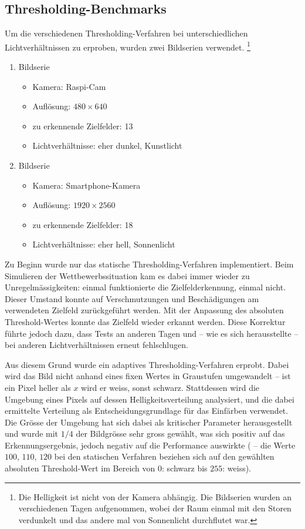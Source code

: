 \subsection{Thresholding-Benchmarks}
\label{app:thresholding}

Um die verschiedenen Thresholding-Verfahren bei unterschiedlichen Lichtverhältnissen zu erproben, wurden zwei Bildserien verwendet. \footnote{Die Helligkeit ist nicht von der Kamera abhängig. Die Bildserien wurden an verschiedenen Tagen aufgenommen, wobei der Raum einmal mit den Storen verdunkelt und das andere mal von Sonnenlicht durchflutet war.}

\begin{enumerate}
    \item Bildserie
        \begin{itemize}
            \item Kamera: Raspi-Cam
            \item Auflösung: $480 \times 640$
            \item zu erkennende Zielfelder: 13
            \item Lichtverhältnisse: eher dunkel, Kunstlicht
        \end{itemize}
    \item Bildserie
        \begin{itemize}
            \item Kamera: Smartphone-Kamera 
            \item Auflösung: $1920 \times 2560$
            \item zu erkennende Zielfelder: 18
            \item Lichtverhältnisse: eher hell, Sonnenlicht
        \end{itemize}
\end{enumerate}

Zu Beginn wurde nur das statische Thresholding-Verfahren implementiert. Beim Simulieren der Wettbewerbssituation kam es dabei immer wieder zu Unregelmässigkeiten: einmal funktionierte die Zielfelderkennung, einmal nicht. Dieser Umstand konnte auf Verschmutzungen und Beschädigungen am verwendeten Zielfeld zurückgeführt werden. Mit der Anpassung des absoluten Threshold-Wertes konnte das Zielfeld wieder erkannt werden. Diese Korrektur führte jedoch dazu, dass Tests an anderen Tagen und -- wie es sich herausstellte -- bei anderen Lichtverhältnissen erneut fehlschlugen.

Aus diesem Grund wurde ein adaptives Thresholding-Verfahren erprobt. Dabei wird das Bild nicht anhand eines fixen Wertes in Graustufen umgewandelt -- ist ein Pixel heller als $x$ wird er weiss, sonst schwarz. Stattdessen wird die Umgebung eines Pixels auf dessen Helligkeitsverteilung analysiert, und die dabei ermittelte Verteilung als Entscheidungsgrundlage für das Einfärben verwendet. Die Grösse der Umgebung hat sich dabei als kritischer Parameter herausgestellt und wurde mit $1/4$ der Bildgrösse sehr gross gewählt, was sich positiv auf das Erkennungsergebnis, jedoch negativ auf die Performance auswirkte ( -- die Werte $100$, $110$, $120$ bei den statischen Verfahren beziehen sich auf den gewählten absoluten Threshold-Wert im Bereich von $0$: schwarz bis $255$: weiss).

